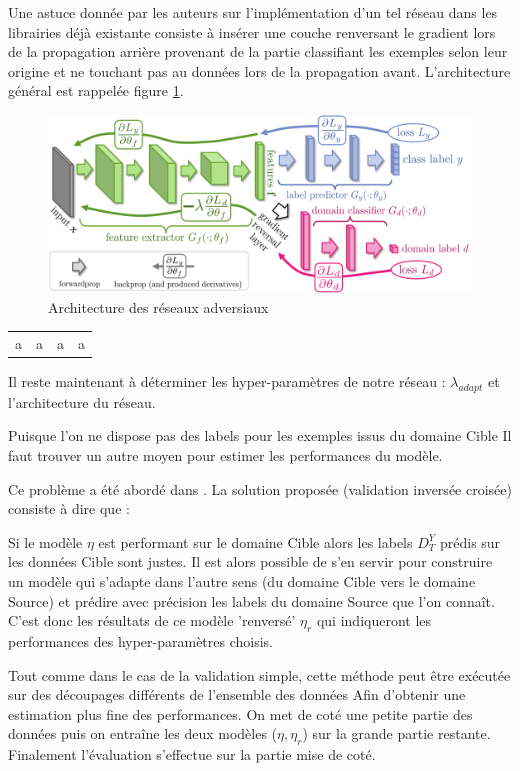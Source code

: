 \documentclass[accepted]{article} %
\begin{document}
Une astuce donnée par les auteurs sur l'implémentation d'un tel réseau dans 
les librairies déjà existante consiste à insérer une couche renversant le 
gradient lors de la propagation arrière provenant de la partie classifiant
les exemples selon leur origine et ne touchant pas au données lors 
de la propagation avant. L'architecture général est rappelée figure 
\ref{fig:arch}.

\begin{figure}
\centering
\includegraphics[width=\textwidth]{fig/arch.png}
\caption{Architecture des réseaux adversiaux}
\label{fig:arch}
\end{figure}

\begin{table}
\centering
\begin{tabular}{c|c|c|c}
a  & a & a&a\\
\end{tabular}
\end{table}


Il reste maintenant à déterminer les hyper-paramètres de notre réseau : 
$\lambda_{adapt}$ et l'architecture du réseau.

Puisque l'on ne dispose pas des labels pour les exemples issus du domaine Cible
Il faut trouver un autre moyen pour estimer les performances du modèle.

Ce problème a été abordé dans \cite{Zhong}. La solution proposée (validation 
inversée croisée) consiste à dire que :

Si le modèle $\eta$ est performant sur le domaine Cible alors les labels $D_T^Y$ 
prédis sur les données Cible sont justes. Il est alors possible de s'en servir
pour construire un modèle qui s'adapte dans l'autre sens (du domaine Cible 
vers le domaine Source) et prédire avec précision les labels du domaine Source
que l'on connaît. C'est donc les résultats de ce modèle 'renversé' $\eta_r$ qui 
indiqueront les performances des hyper-paramètres choisis. 

Tout comme dans le cas de la validation simple, cette méthode peut être 
exécutée sur des découpages différents de l'ensemble des données Afin 
d'obtenir une estimation plus fine des performances. 
On met de coté une petite partie des données puis on entraîne les deux modèles
($\eta,\eta_r$) sur la grande partie restante. Finalement l'évaluation 
s'effectue sur la partie mise de coté.
\end{document}
